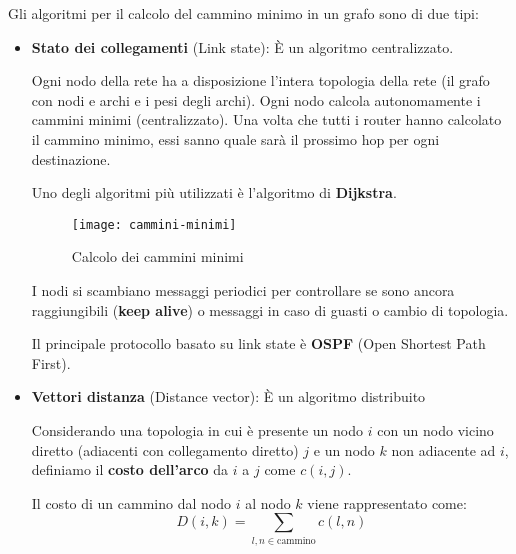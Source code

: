 \documentclass[a4paper]{article}
\begin{document}
\vspace{1em}
\noindent
Gli algoritmi per il calcolo del cammino minimo in un grafo sono di due tipi:
\begin{itemize}
  \item \textbf{Stato dei collegamenti} (Link state): È un algoritmo centralizzato.

    \vspace{1em}
    \noindent
    Ogni nodo della rete ha a disposizione l'intera topologia della rete (il grafo
    con nodi e archi e i pesi degli archi). Ogni nodo calcola autonomamente i cammini
    minimi (centralizzato). Una volta che tutti i router hanno calcolato il cammino
    minimo, essi sanno quale sarà il prossimo hop per ogni destinazione.

    Uno degli algoritmi più utilizzati è l'algoritmo di \textbf{Dijkstra}.
    \begin{figure}[H]
      \centering
      \texttt{[image: cammini-minimi]}
      \caption{Calcolo dei cammini minimi}
    \end{figure}

    \vspace{1em}
    \noindent
    I nodi si scambiano messaggi periodici per controllare se sono ancora raggiungibili
    (\textbf{keep alive}) o messaggi in caso di guasti o cambio di topologia.

    \vspace{1em}
    \noindent
    Il principale protocollo basato su link state è \textbf{OSPF} (Open Shortest Path First).

  \item \textbf{Vettori distanza} (Distance vector): È un algoritmo distribuito

    \vspace{1em}
    \noindent
    Considerando una topologia in cui è presente un nodo \( i \) con un nodo vicino diretto
    (adiacenti con collegamento diretto) \( j \) e un nodo \( k \) non adiacente ad \( i \), 
    definiamo il \textbf{costo dell'arco} da \( i \) a \( j \) come \( c(i,j) \).

    Il costo di un cammino dal nodo \( i \) al nodo \( k \) viene rappresentato come:
    \[
      D(i,k) = \sum_{l,n \in \text{cammino}} c(l,n)
    \] 


\end{itemize}
\end{document}
